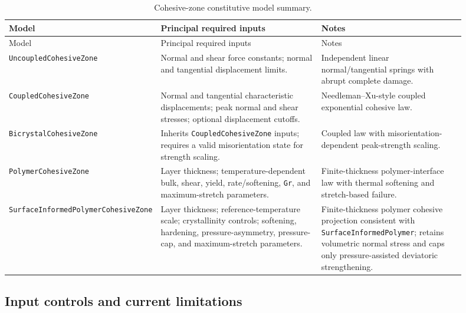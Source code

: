 \begin{longtable}{>{\raggedright\arraybackslash}p{0.22\linewidth}>{\raggedright\arraybackslash}p{0.36\linewidth}>{\raggedright\arraybackslash}p{0.32\linewidth}}
\caption{Cohesive-zone constitutive model summary.}\label{tab:cz-model-summary}\\
\toprule
Model & Principal required inputs & Notes \\
\midrule
\endfirsthead
\toprule
Model & Principal required inputs & Notes \\
\midrule
\endhead
\bottomrule
\endfoot
\texttt{Uncoupled}\newline\texttt{CohesiveZone} & Normal and shear force constants; normal and tangential displacement limits. & Independent linear normal/tangential springs with abrupt complete damage. \\
\texttt{Coupled}\newline\texttt{CohesiveZone} & Normal and tangential characteristic displacements; peak normal and shear stresses; optional displacement cutoffs. & Needleman--Xu-style coupled exponential cohesive law. \\
\texttt{Bicrystal}\newline\texttt{CohesiveZone} & Inherits \texttt{CoupledCohesiveZone} inputs; requires a valid misorientation state for strength scaling. & Coupled law with misorientation-dependent peak-strength scaling. \\
\texttt{Polymer}\newline\texttt{CohesiveZone} & Layer thickness; temperature-dependent bulk, shear, yield, rate/softening, \texttt{Gr}, and maximum-stretch parameters. & Finite-thickness polymer-interface law with thermal softening and stretch-based failure. \\
\texttt{SurfaceInformed}\newline\texttt{PolymerCohesiveZone} & Layer thickness; reference-temperature scale; crystallinity controls; softening, hardening, pressure-asymmetry, pressure-cap, and maximum-stretch parameters. & Finite-thickness polymer cohesive projection consistent with \texttt{SurfaceInformedPolymer}; retains volumetric normal stress and caps only pressure-assisted deviatoric strengthening. \\
\end{longtable}


\subsection{Input controls and current limitations}

